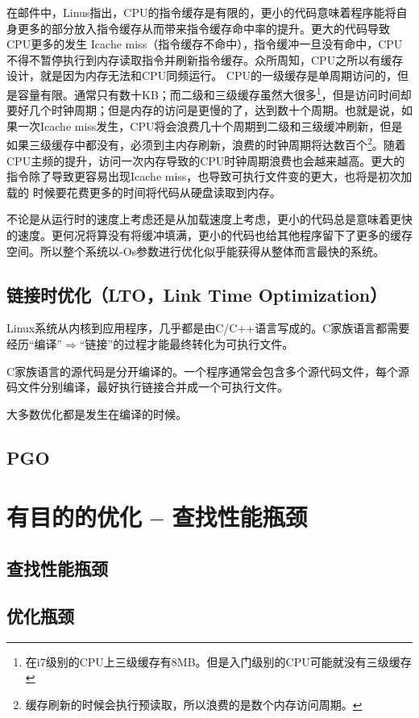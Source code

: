 \documentclass[amstex,twoside]{ctexbook}
\begin{document}
在邮件中，Linus指出，CPU的指令缓存是有限的，更小的代码意味着程序能将自身更多的部分放入指令缓存从而带来指令缓存命中率的提升。更大的代码导致CPU更多的发生 Icache miss（指令缓存不命中），指令缓冲一旦没有命中，CPU不得不暂停执行到内存读取指令并刷新指令缓存。众所周知，CPU之所以有缓存设计，就是因为内存无法和CPU同频运行。
CPU的一级缓存是单周期访问的，但是容量有限。通常只有数十KB；而二级和三级缓存虽然大很多\footnote{在i7级别的CPU上三级缓存有8MB。但是入门级别的CPU可能就没有三级缓存}，但是访问时间却要好几个时钟周期；但是内存的访问是更慢的了，达到数十个周期。也就是说，如果一次Icache miss发生，CPU将会浪费几十个周期到二级和三级缓冲刷新，但是如果三级缓存中都没有，必须到主内存刷新，浪费的时钟周期将达数百个\footnote{缓存刷新的时候会执行预读取，所以浪费的是数个内存访问周期。}。随着CPU主频的提升，访问一次内存导致的CPU时钟周期浪费也会越来越高。更大的指令除了导致更容易出现Icache miss，也导致可执行文件变的更大，也将是初次加载的
时候要花费更多的时间将代码从硬盘读取到内存。

不论是从运行时的速度上考虑还是从加载速度上考虑，更小的代码总是意味着更快的速度。更何况将算没有将缓冲填满，更小的代码也给其他程序留下了更多的缓存空间。所以整个系统以-Os参数进行优化似乎能获得从整体而言最快的系统。



\subsection{链接时优化（LTO，Link Time Optimization）}

Linux系统从内核到应用程序，几乎都是由C/C++语言写成的。C家族语言都需要经历“编译”$\Rightarrow$“链接”的过程才能最终转化为可执行文件。

C家族语言的源代码是分开编译的。一个程序通常会包含多个源代码文件，每个源码文件分别编译，最好执行链接合并成一个可执行文件。

大多数优化都是发生在编译的时候。


\subsection{PGO}
\section{  有目的的优化 – 查找性能瓶颈}
\subsection{ 查找性能瓶颈}
\subsection{  优化瓶颈}
\end{document}
